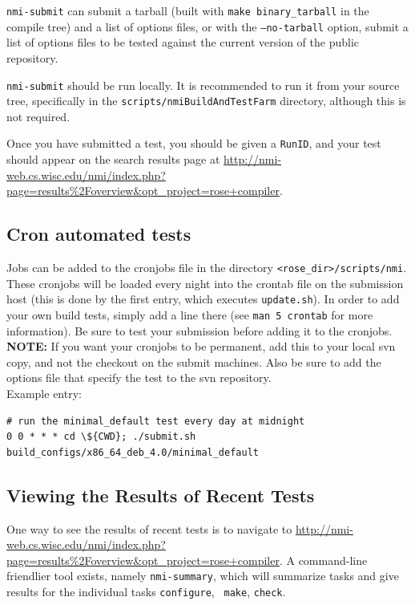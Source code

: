 {\tt nmi-submit} can submit a tarball (built with {\tt make
binary\_tarball} in the compile tree) and a list of options files, or with the
{\tt --no-tarball} option, submit a list of options files to be tested against
the current version of the public repository.

{\tt nmi-submit} should be run locally.  It is recommended to run it from your
source tree, specifically in the {\tt scripts/nmiBuildAndTestFarm} directory,
although this is not required.

Once you have submitted a test, you should be given a {\tt RunID}, and your test
should appear on the search results page at
\url{http://nmi-web.cs.wisc.edu/nmi/index.php?page=results\%2Foverview&opt\_project=rose+compiler}.


\subsection{Cron automated tests}%
Jobs can be added to the cronjobs file in the directory {\tt <rose\_dir>/scripts/nmi}. 
These cronjobs will be loaded every night into the
crontab file on the submission host (this is done by the first entry, which
executes {\tt update.sh}). In order to add your own build tests, simply add a
line there (see {\tt man 5 crontab} for more information). Be sure to test your
submission before adding it to the cronjobs.\\

{\bf NOTE:} If you want your cronjobs to be permanent, add this to your local svn
copy, and not the checkout on the submit machines. Also be sure to add the 
options file that specify the test to the svn repository.\\

Example entry:
\begin{verbatim}
# run the minimal_default test every day at midnight
0 0 * * * cd \${CWD}; ./submit.sh build_configs/x86_64_deb_4.0/minimal_default
\end{verbatim}%


\subsection{Viewing the Results of Recent Tests}
\label{sec:nmi-summary}

One way to see the results of recent tests is to navigate to
\url{http://nmi-web.cs.wisc.edu/nmi/index.php?page=results\%2Foverview&opt\_project=rose+compiler}.
A command-line friendlier tool exists, namely {\tt nmi-summary}, which will
summarize tasks and give results for the individual tasks {\tt configure}, {\tt
make}, {\tt check}.

